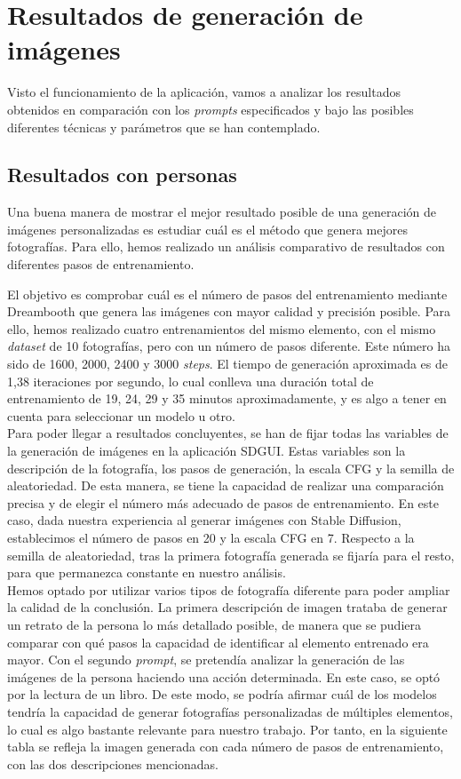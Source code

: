 \section{Resultados de generación de imágenes}

Visto el funcionamiento de la aplicación, vamos a analizar los resultados obtenidos en comparación con los \textit{prompts} especificados y bajo las posibles diferentes técnicas y parámetros que se han contemplado. 


\subsection{Resultados con personas}
Una buena manera de mostrar el mejor resultado posible de una generación de imágenes personalizadas es estudiar cuál es el método que genera mejores fotografías. Para ello, hemos realizado un análisis comparativo de resultados con diferentes pasos de entrenamiento.

El objetivo es comprobar cuál es el número de pasos del entrenamiento mediante Dreambooth que genera las imágenes con mayor calidad y precisión posible. Para ello, hemos realizado cuatro entrenamientos del mismo elemento, con el mismo \textit{dataset} de 10 fotografías, pero con un número de pasos diferente. Este número ha sido de 1600, 2000, 2400 y 3000 \textit{steps}. El tiempo de generación aproximada es de 1,38 iteraciones por segundo, lo cual conlleva una duración total de entrenamiento de 19, 24, 29 y 35 minutos aproximadamente, y es algo a tener en cuenta para seleccionar un modelo u otro.\\

Para poder llegar a resultados concluyentes, se han de fijar todas las variables de la generación de imágenes en la aplicación SDGUI. Estas variables son la descripción de la fotografía, los pasos de generación, la escala CFG y la semilla de aleatoriedad. De esta manera, se tiene la capacidad de realizar una comparación precisa y de elegir el número más adecuado de pasos de entrenamiento. En este caso, dada nuestra experiencia al generar imágenes con Stable Diffusion, establecimos el número de pasos en 20 y la escala CFG en 7. Respecto a la semilla de aleatoriedad, tras la primera fotografía generada se fijaría para el resto, para que permanezca constante en nuestro análisis.\\

Hemos optado por utilizar varios tipos de fotografía diferente para poder ampliar la calidad de la conclusión. La primera descripción de imagen trataba de generar un retrato de la persona lo más detallado posible, de manera que se pudiera comparar con qué pasos la capacidad de identificar al elemento entrenado era mayor. Con el segundo \textit{prompt}, se pretendía analizar la generación de las imágenes de la persona haciendo una acción determinada. En este caso, se optó por la lectura de un libro. De este modo, se podría afirmar cuál de los modelos tendría la capacidad de generar fotografías personalizadas de múltiples elementos, lo cual es algo bastante relevante para nuestro trabajo. Por tanto, en la siguiente tabla se refleja la imagen generada con cada número de pasos de entrenamiento, con las dos descripciones mencionadas.\\

